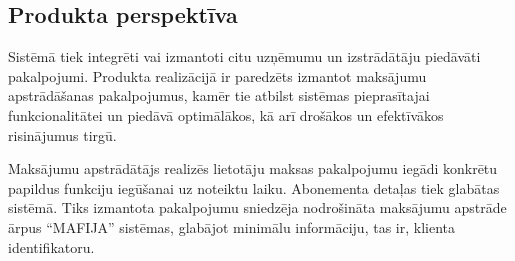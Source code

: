 \subsection{Produkta perspektīva}
Sistēmā tiek integrēti vai izmantoti citu uzņēmumu un izstrādātāju piedāvāti
pakalpojumi. Produkta realizācijā ir paredzēts izmantot maksājumu apstrādāšanas
pakalpojumus, kamēr tie atbilst sistēmas pieprasītajai funkcionalitātei un
piedāvā optimālākos, kā arī drošākos un efektīvākos risinājumus tirgū.

Maksājumu apstrādātājs realizēs lietotāju maksas pakalpojumu iegādi konkrētu
papildus funkciju iegūšanai uz noteiktu laiku. Abonementa detaļas tiek glabātas
sistēmā. Tiks izmantota pakalpojumu sniedzēja nodrošināta maksājumu apstrāde
ārpus ``MAFIJA'' sistēmas, glabājot minimālu informāciju, tas ir, klienta
identifikatoru.

